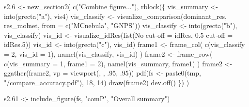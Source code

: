 \documentclass[
]{article}
\newenvironment{Shaded}{\begin{snugshade}}{\end{snugshade}}
\newcommand{\AttributeTok}[1]{\textcolor[rgb]{0.77,0.63,0.00}{#1}}
\newcommand{\DecValTok}[1]{\textcolor[rgb]{0.00,0.00,0.81}{#1}}
\newcommand{\FloatTok}[1]{\textcolor[rgb]{0.00,0.00,0.81}{#1}}
\newcommand{\FunctionTok}[1]{\textcolor[rgb]{0.00,0.00,0.00}{#1}}
\newcommand{\NormalTok}[1]{#1}
\newcommand{\OtherTok}[1]{\textcolor[rgb]{0.56,0.35,0.01}{#1}}
\newcommand{\StringTok}[1]{\textcolor[rgb]{0.31,0.60,0.02}{#1}}
\begin{document}
\begin{Shaded}
\begin{Highlighting}[]
\NormalTok{s2}\FloatTok{.6} \OtherTok{\textless{}{-}} \FunctionTok{new\_section2}\NormalTok{(}
  \FunctionTok{c}\NormalTok{(}\StringTok{"Combine figure..."}\NormalTok{),}
  \FunctionTok{rblock}\NormalTok{(\{}
\NormalTok{    vis\_summary }\OtherTok{\textless{}{-}} \FunctionTok{into}\NormalTok{(}\FunctionTok{grecta}\NormalTok{(}\StringTok{"a"}\NormalTok{), vis4)}
\NormalTok{    vis\_classify }\OtherTok{\textless{}{-}} \FunctionTok{visualize\_comparison}\NormalTok{(dominant\_res, res\_molnet,}
      \AttributeTok{from =} \FunctionTok{c}\NormalTok{(}\StringTok{"MCnebula"}\NormalTok{, }\StringTok{"GNPS"}\NormalTok{))}
\NormalTok{    vis\_classify }\OtherTok{\textless{}{-}} \FunctionTok{into}\NormalTok{(}\FunctionTok{grecta}\NormalTok{(}\StringTok{"b"}\NormalTok{), vis\_classify)}
\NormalTok{    vis\_id }\OtherTok{\textless{}{-}} \FunctionTok{visualize\_idRes}\NormalTok{(}\FunctionTok{list}\NormalTok{(}\StringTok{\textasciigrave{}}\AttributeTok{No cut{-}off}\StringTok{\textasciigrave{}} \OtherTok{=}\NormalTok{ idRes, }\StringTok{\textasciigrave{}}\AttributeTok{0.5 cut{-}off}\StringTok{\textasciigrave{}} \OtherTok{=}\NormalTok{ idRes}\FloatTok{.5}\NormalTok{))}
\NormalTok{    vis\_id }\OtherTok{\textless{}{-}} \FunctionTok{into}\NormalTok{(}\FunctionTok{grecta}\NormalTok{(}\StringTok{"c"}\NormalTok{), vis\_id)}
\NormalTok{    frame1 }\OtherTok{\textless{}{-}} \FunctionTok{frame\_col}\NormalTok{(}
      \FunctionTok{c}\NormalTok{(}\AttributeTok{vis\_classify =} \DecValTok{2}\NormalTok{, }\AttributeTok{vis\_id =} \DecValTok{1}\NormalTok{),}
      \FunctionTok{namel}\NormalTok{(vis\_classify, vis\_id)}
\NormalTok{    )}
\NormalTok{    frame2 }\OtherTok{\textless{}{-}} \FunctionTok{frame\_row}\NormalTok{(}
      \FunctionTok{c}\NormalTok{(}\AttributeTok{vis\_summary =} \DecValTok{1}\NormalTok{, }\AttributeTok{frame1 =} \DecValTok{2}\NormalTok{),}
      \FunctionTok{namel}\NormalTok{(vis\_summary, frame1)}
\NormalTok{    )}
\NormalTok{    frame2 }\OtherTok{\textless{}{-}} \FunctionTok{ggather}\NormalTok{(frame2, }\AttributeTok{vp =} \FunctionTok{viewport}\NormalTok{(, , .}\DecValTok{95}\NormalTok{, .}\DecValTok{95}\NormalTok{))}
    \FunctionTok{pdf}\NormalTok{(fs }\OtherTok{\textless{}{-}} \FunctionTok{paste0}\NormalTok{(tmp, }\StringTok{"/compare\_accuracy.pdf"}\NormalTok{), }\DecValTok{18}\NormalTok{, }\DecValTok{14}\NormalTok{)}
    \FunctionTok{draw}\NormalTok{(frame2)}
    \FunctionTok{dev.off}\NormalTok{()}
\NormalTok{  \})}
\NormalTok{)}

\NormalTok{s2}\FloatTok{.61} \OtherTok{\textless{}{-}} \FunctionTok{include\_figure}\NormalTok{(fs, }\StringTok{"comP"}\NormalTok{, }\StringTok{"Overall summary"}\NormalTok{)}


\end{Highlighting}
\end{Shaded}
\end{document}
